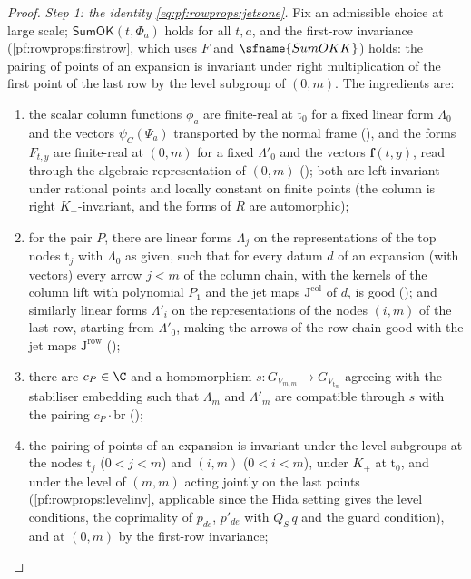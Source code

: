 \begin{proof}
\emph{Step 1: the identity \eqref{eq:pf:rowprops:jetsone}.} Fix an admissible choice at large scale; $\mathsf{SumOK}(t,\Phi_a)$
holds for all $t,a$, and the first-row invariance (\cref{pf:rowprops:firstrow}, which uses $F$ and $\sfname{SumOKK}$) holds: the
pairing of points of an expansion is invariant under right multiplication of the first point of the last row by the level
subgroup of $(0,m)$. The ingredients are:
\begin{enumerate}[label=(\alph*)]
\item the scalar column functions $\phi_a$ are finite-real at $\mathrm t_0$ for a fixed linear form $\Lambda_0$ and the
vectors $\psi_C(\Psi_a)$ transported by the normal frame (), and the forms
$F_{t,y}$ are finite-real at $(0,m)$ for a fixed $\Lambda'_0$ and the vectors $\mathbf{f}(t,y)$, read through the
algebraic representation of $(0,m)$ (); both are left invariant under rational
points and locally constant on finite points (the column is right $K_+$-invariant, and the forms of $R$ are automorphic);
\item for the pair $P$, there are linear forms $\Lambda_j$ on the representations of the top nodes $\mathrm t_j$ with
$\Lambda_0$ as given, such that for every datum $d$ of an expansion (with vectors) every arrow $j<m$ of the column chain,
with the kernels of the column lift with polynomial $P_1$ and the jet maps $\mathrm{J}^{\mathrm{col}}$ of $d$, is good
(); and similarly linear forms $\Lambda'_i$ on the representations of the
nodes $(i,m)$ of the last row, starting from $\Lambda'_0$, making the arrows of the row chain good with the jet maps
$\mathrm{J}^{\mathrm{row}}$ ();
\item there are $c_P\in\C$ and a homomorphism $s:G_{V_{m,m}}\to G_{V_{\mathrm t_m}}$ agreeing with the stabiliser embedding
such that $\Lambda_m$ and $\Lambda'_m$ are compatible through $s$ with the pairing $c_P\cdot\mathrm{br}$
();
\item the pairing of points of an expansion is invariant under the level subgroups at the nodes $\mathrm t_j$ ($0<j<m$)
and $(i,m)$ ($0<i<m$), under $K_+$ at $\mathrm t_0$, and under the level of $(m,m)$ acting jointly on the last points
(\cref{pf:rowprops:levelinv}, applicable since the Hida setting gives the level conditions, the coprimality of $p_{de}$,
$p'_{de}$ with $Q_S\,q$ and the guard condition), and at $(0,m)$ by the first-row invariance;

\end{enumerate}
\end{proof}
